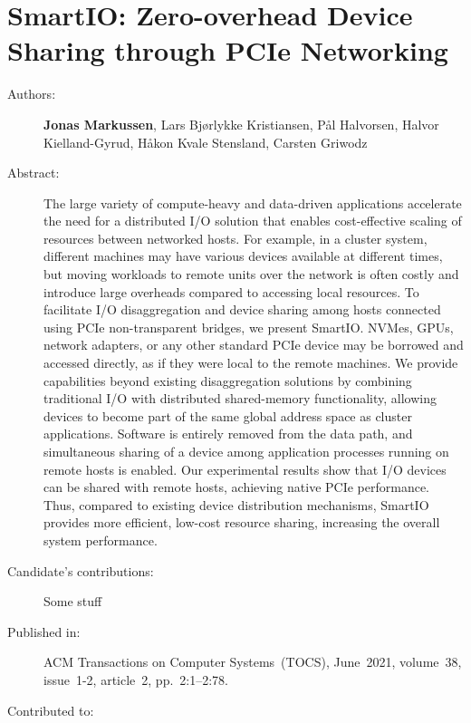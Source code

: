 \chapter{SmartIO: Zero-overhead Device Sharing through PCIe Networking}
\label{paper:TOCS-2021}
\paperthumb

\begin{description}
	\item[Authors:]
		\textbf{Jonas Markussen}, Lars Bj{\o}rlykke Kristiansen, P{\aa}l Halvorsen,
		Halvor Kielland-Gyrud, H{\aa}kon Kvale Stensland, Carsten Griwodz

	\item[Abstract:]
		The large variety of compute-heavy and data-driven applications accelerate the need for a distributed
		I/O solution that enables cost-effective scaling of resources between networked hosts. For example,
		in a cluster system, different machines may have various devices available at different times, 
		but moving workloads to remote units over the network is often costly and introduce 
		large overheads compared to accessing local resources. 
		To facilitate I/O disaggregation and device sharing among hosts connected using PCIe non-transparent
		bridges, we present SmartIO. NVMes, GPUs, network adapters, or any other standard PCIe device may be 
		borrowed and accessed directly, as if they were local to the remote machines.
		We provide capabilities beyond existing disaggregation solutions 
		by combining traditional I/O with distributed shared-memory functionality, allowing devices 
		to become part of the same global address space as cluster applications.
		Software is entirely removed from the data path, and simultaneous sharing of a device among 
		application processes running on remote hosts is enabled.
		Our experimental results show that I/O devices can be shared with remote hosts,
		achieving native PCIe performance.
		Thus, compared to existing device distribution mechanisms, SmartIO provides more efficient, low-cost resource
		sharing, increasing the overall system performance.

	\item[Candidate's contributions:]
		Some stuff

	\item[Published in:]
		ACM Transactions on Computer Systems~(TOCS), 
		June~2021, volume~38, issue~1-2, article~2, pp.~2:1--2:78.

	\item[Contributed to:]

\end{description}

